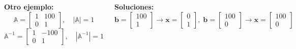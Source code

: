 \documentclass[9pt, aspectratio=169]{beamer}
\begin{document}
\begin{frame}[fragile]
\begin{columns}[t]
\cx

\textbf{Otro ejemplo:}
\[ \mathbb{A} = \begin{bmatrix} 1 & 100 \\ 0 & 1 \end{bmatrix}, \quad |\mathbb{A}| = 1 \]
\[ \mathbb{A}^{-1} = \begin{bmatrix} 1 & -100 \\ 0 & 1 \end{bmatrix}, \quad |\mathbb{A}^{-1}| = 1 \]
\pause

\textbf{Soluciones:}
\[ \bm{b} = \begin{bmatrix} 100 \\ 1 \end{bmatrix} \rightarrow \bm{x} = \begin{bmatrix} 0 \\ 1 \end{bmatrix}, \; \bm{b} = \begin{bmatrix} 100 \\ 0 \end{bmatrix} \rightarrow \bm{x} = \begin{bmatrix} 100 \\ 0 \end{bmatrix}  \]
 \pause

\cx
{}
\end{columns}
\end{frame}
\end{document}
